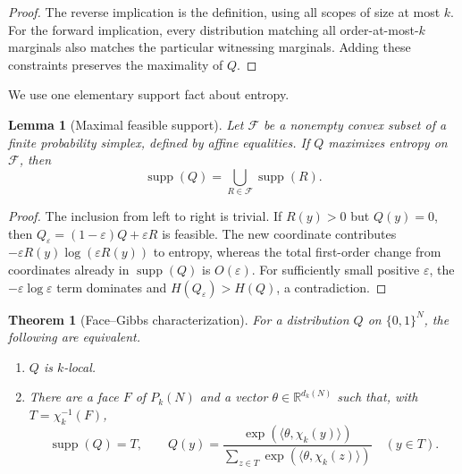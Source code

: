 \documentclass{article}
\newcommand{\supp}{\operatorname{supp}}
\newcommand{\bits}{\{0,1\}}
\newtheorem{theorem}{Theorem}
\newtheorem{lemma}{Lemma}
\begin{document}
\begin{proof}
The reverse implication is the definition, using all scopes of size at most
$k$.  For the forward implication, every distribution matching all
order-at-most-$k$ marginals also matches the particular witnessing marginals.
Adding these constraints preserves the maximality of $Q$.
\end{proof}

We use one elementary support fact about entropy.

\begin{lemma}[Maximal feasible support]\label{lem:max-support}
Let $\mathcal F$ be a nonempty convex subset of a finite probability simplex,
defined by affine equalities.  If $Q$ maximizes entropy on $\mathcal F$, then
\[
  \supp(Q)=\bigcup_{R\in\mathcal F}\supp(R).
\]
\end{lemma}

\begin{proof}
The inclusion from left to right is trivial.  If $R(y)>0$ but $Q(y)=0$, then
$Q_\varepsilon=(1-\varepsilon)Q+\varepsilon R$ is feasible.  The new coordinate
contributes $-\varepsilon R(y)\log(\varepsilon R(y))$ to entropy, whereas the
total first-order change from coordinates already in $\supp(Q)$ is $O(\varepsilon)$.
For sufficiently small positive $\varepsilon$, the $-\varepsilon\log\varepsilon$
term dominates and $H(Q_\varepsilon)>H(Q)$, a contradiction.
\end{proof}

\begin{theorem}[Face--Gibbs characterization]\label{thm:face-gibbs}
For a distribution $Q$ on $\bits^N$, the following are equivalent.
\begin{enumerate}
  \item $Q$ is $k$-local.
  \item There are a face $F$ of $P_k(N)$ and a vector
  $\theta\in\mathbb R^{d_k(N)}$ such that, with
  $T=\chi_k^{-1}(F)$,
  \[
    \supp(Q)=T,
    \qquad
    Q(y)=\frac{\exp(\langle\theta,\chi_k(y)\rangle)}
    {\sum_{z\in T}\exp(\langle\theta,\chi_k(z)\rangle)}
    \quad (y\in T).
  \]
\end{enumerate}
\end{theorem}
\end{document}

